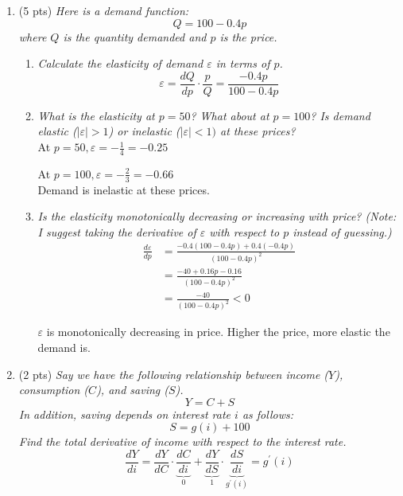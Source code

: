 \documentclass{./../../../Latex/tests}
\begin{document}
\begin{enumerate}
\vspace{1cm}

\item (5 pts) \textit{Here is a demand function:}
 $$ Q = 100-0.4p$$
\textit{ where $Q$ is the quantity demanded and $p$ is the price. }
 \begin{enumerate}
  \item  \textit{Calculate the elasticity of demand $\varepsilon$ in terms of $p$.}
   $$\varepsilon=\frac{d Q}{d p} \cdot \frac{p}{Q}=\frac{-0.4 p}{100-0.4 p}$$
   
  \item \textit{What is the elasticity at $p=50$? What about at $p=100$? Is demand elastic ($|\varepsilon|>1$) or inelastic ($|\varepsilon|<1)$ at these prices?} \\
 
At  $p=50, \varepsilon=-\frac{1}{4}=-0.25$

At $p=100, \varepsilon=-\frac{2}{3}=-0.66$ \\
Demand is inelastic at these prices. \\

 \item \textit{Is the elasticity monotonically decreasing or increasing with price? (Note: I suggest taking the derivative of $\varepsilon$ with respect to $p$ instead of guessing.)} \\ 
 $$
\begin{aligned}
\frac{d \varepsilon}{d p}&=\frac{-0.4(100-0.4 p)+0.4(-0.4 p)}{(100-0.4 p)^{2}} \\
&=\frac{-40+0.16 p-0.16}{(100-0.4 p)^{2}} \\&=\frac{-40}{(100-0.4 p)^{2}}<0
\end{aligned}
$$

$\varepsilon$ is monotonically decreasing in price. Higher the price, more elastic the demand is.
\end{enumerate}

\vspace{2cm}

\item (2 pts) \textit{Say we have the following relationship between income ($Y$), consumption ($C$), and saving ($S$). }
$$ Y= C+S$$
\textit{In addition, saving depends on interest rate $i$ as follows:}
$$ S = g(i)+100 $$
\textit{Find the total derivative of income with respect to the interest rate. }
 $$\frac{d Y}{d i}=\frac{d Y}{d C} \cdot \underbrace{\frac{d C}{d i}}_{0}+\underbrace{\frac{d Y}{d S}}_{1} \cdot \underbrace{\frac{d S}{d i}}_{g^{\prime}(i)} = g^{\prime}(i)$$
\end{enumerate}
\end{document}
